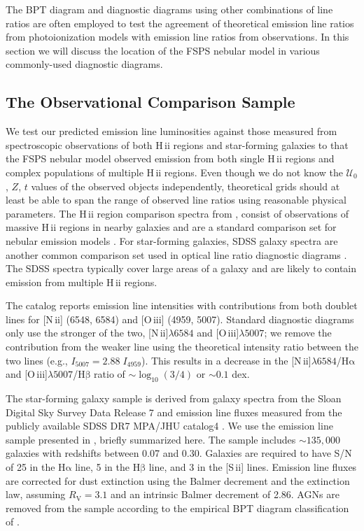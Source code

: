 \documentclass[linenumbers, trackchanges, tighten]{aastex61}%
\newcommand{\FSPS}{{\sc FSPS}\xspace}
\newcommand{\logten}{\ensuremath{\log_{10}}}
\newcommand{\nii}{[N\,{\sc ii}]\xspace}
\newcommand{\sii}{[S\,{\sc ii}]\xspace}
\newcommand{\oiii}{[O\,{\sc iii}]\xspace}
\newcommand{\ha}{\ensuremath{\mathrm{H\alpha}}}
\newcommand{\hb}{\ensuremath{\mathrm{H\beta}}}
\newcommand{\hii}{H\,{\sc ii}\xspace}
\newcommand\lam[1]{\ensuremath{\lambda #1}}
\newcommand{\U}{\ensuremath{\mathcal{U}_{0}}}
\newcommand\niiha{\nii{}\lam{6584}/\ha{}}
\newcommand\oiiihb{\oiii{}\lam{5007}/\hb{}}
\begin{document}
The BPT diagram and diagnostic diagrams using other combinations of line ratios are often employed to test the agreement of theoretical emission line ratios from photoionization models with emission line ratios from observations. In this section we will discuss the location of the \FSPS nebular model in various commonly-used diagnostic diagrams.

\subsection{The Observational Comparison Sample}

We test our predicted emission line luminosities against those measured from spectroscopic observations of both \hii regions and star-forming galaxies to  that the \FSPS nebular model  observed emission from both single \hii regions and complex populations of multiple \hii regions. Even though we do not know the \U{}, $Z$, $t$ values of the observed objects independently, theoretical grids should at least be able to span the range of observed line ratios using reasonable physical parameters. The \hii region comparison spectra from \citet{vanzee98}, consist of observations of massive \hii regions in nearby galaxies and are a standard comparison set for nebular emission models \citep{Dopita00, Kewley06, Levesque10, Dopita13}. For star-forming galaxies, SDSS galaxy spectra are another common comparison set used in optical line ratio diagnostic diagrams \citep{Dopita00, Kewley06, Levesque10}. The SDSS spectra typically cover large areas of a galaxy and are likely to contain emission from multiple \hii regions.

The \citet{vanzee98} catalog reports emission line intensities with contributions from both doublet lines for \nii{} (6548, 6584) and \oiii{} (4959, 5007). Standard diagnostic diagrams only use the stronger of the two, \nii{}\lam{6584} and \oiii{}\lam{5007}; we remove the contribution from the weaker line using the theoretical intensity ratio between the two lines (e.g., $I_{5007} = 2.88\;I_{4959}$). This results in a decrease in the \niiha{} and \oiiihb{} ratio of $\sim \logten \left(3/4\right)$ or $\sim 0.1$ dex.

The star-forming galaxy sample is derived from galaxy spectra from the Sloan Digital Sky Survey Data Release 7 \citep[SDSS DR7;][]{York00, Abazajian09} and emission line fluxes measured from the publicly available SDSS DR7 MPA/JHU catalog4 \citep{Kauffmann03a, Brinchmann04, Salim07}. We use the emission line sample presented in \citet{Telford16}, briefly summarized here. The sample includes $\sim 135,000$ galaxies with redshifts between 0.07 and 0.30. Galaxies are required to have S/N of 25 in the \ha{} line, 5 in the \hb{} line, and 3 in the \sii{} lines. Emission line fluxes are corrected for dust extinction using the Balmer decrement and the \citet{Cardelli89} extinction law, assuming $R_{\mathrm{V}} = 3.1$ and an intrinsic Balmer decrement of 2.86. AGNs are removed from the sample according to the empirical BPT diagram classification of \citet{Kauffmann03b}.
\end{document}
